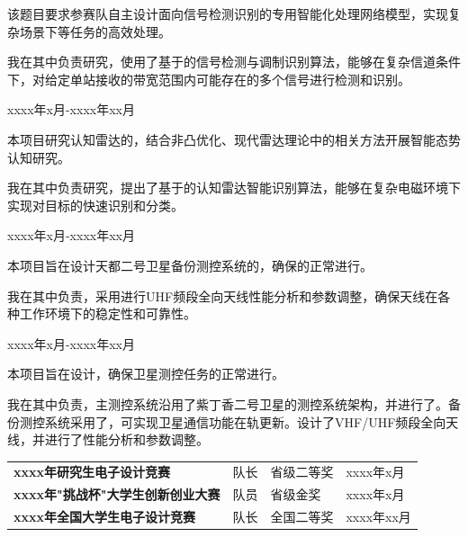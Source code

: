 该题目要求参赛队自主设计面向信号检测识别的专用智能化处理网络模型，实现复杂场景下等任务的高效处理。

我在其中负责研究，使用了基于的信号检测与调制识别算法，能够在复杂信道条件下，对给定单站接收的带宽范围内可能存在的多个信号进行检测和识别。


\vspace{1em}
 \hfill {xxxx年x月-xxxx年xx月}

本项目研究认知雷达的，结合非凸优化、现代雷达理论中的相关方法开展智能态势认知研究。

我在其中负责研究，提出了基于的认知雷达智能识别算法，能够在复杂电磁环境下实现对目标的快速识别和分类。


\vspace{1em}
 \hfill {xxxx年x月-xxxx年xx月}

本项目旨在设计天都二号卫星备份测控系统的，确保的正常进行。

我在其中负责，采用进行UHF频段全向天线性能分析和参数调整，确保天线在各种工作环境下的稳定性和可靠性。


\vspace{1em}
 \hfill {xxxx年x月-xxxx年xx月}

本项目旨在设计，确保卫星测控任务的正常进行。

我在其中负责，主测控系统沿用了紫丁香二号卫星的测控系统架构，并进行了。备份测控系统采用了，可实现卫星通信功能在轨更新。设计了VHF/UHF频段全向天线，并进行了性能分析和参数调整。


{\setlength{\parindent}{0pt}
\begin{tabularx}{\textwidth}{Xp{}p{}p{}}
    \textbf{xxxx年研究生电子设计竞赛} & 队长 & 省级二等奖 & xxxx年x月\\
    \textbf{xxxx年"挑战杯"大学生创新创业大赛} & 队员 & 省级金奖 & xxxx年x月\\
    \textbf{xxxx年全国大学生电子设计竞赛} & 队长 & 全国二等奖 & xxxx年xx月\\
\end{tabularx}
}

